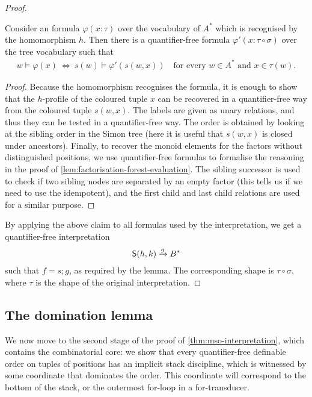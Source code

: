 \begin{proof}
 \begin{claim} \label{claim:factorisation-paths-qf-reduction} Consider an \mso formula $\varphi(x : \tau)$ over the vocabulary of $A^*$ which  is recognised by the homomorphism $h$. Then there is a quantifier-free formula $\varphi'(x : \tau \circ \sigma)$ over the tree vocabulary such that
    \begin{align*}
    w \models \varphi(x) \ \iff \  s(w) \models \varphi'(s(w,x))
    \quad \text{for every $w \in A^*$ and $x \in \tau(w)$.}
    \end{align*}
 \end{claim}
 \begin{proof}
    Because the homomorphism recognises the formula,  it is enough to show that the $h$-profile of the coloured tuple $x$ can be recovered in a quantifier-free way from the coloured tuple $s(w,x)$. The labels are given as unary relations, and thus they can be tested in a quantifier-free way. The order is obtained by looking at the sibling order in the Simon tree (here it is useful that $s(w,x)$ is closed under ancestors). Finally, to recover the monoid elements for the factors without distinguished positions, we use quantifier-free formulas to formalise the reasoning in the proof of \cref{lem:factorisation-forest-evaluation}. The sibling successor is used to check if two sibling nodes are separated by an empty factor (this tells us if we need to use the idempotent), and the first child and last child relations are used for a similar purpose.
 \end{proof}
 By applying the above claim to all formulas used by the \mso interpretation, we get  a quantifier-free interpretation
         \begin{align*}
    \mathsf S(h, k) \xrightarrow {g}  B^*
    \end{align*}
such that $f = s;g$, as required by the lemma. The corresponding shape is  $\tau \circ \sigma$, where $\tau$ is the shape of the original \mso interpretation.
\end{proof}




\subsection{The domination lemma} 
\label{sec:rational-domination}
We now move to the second stage of the proof of \cref{thm:mso-interpretation}, which contains the  combinatorial core: we show that every quantifier-free definable order on tuples of positions has an implicit stack discipline, which is witnessed by some coordinate that dominates the order.  This coordinate will correspond to the bottom of the stack, or the outermost for-loop in a for-transducer. 


